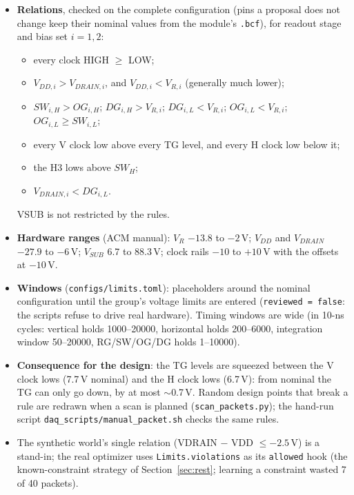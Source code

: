 \documentclass[10pt]{article}
\newcommand{\code}[1]{\texttt{#1}}
\begin{document}
\begin{itemize}
\item \textbf{Relations}, checked on the complete configuration (pins a proposal does not change keep their nominal values from the module's
  \code{.bcf}), for readout stage and bias set $i = 1, 2$:
  \begin{itemize}
  \item every clock HIGH $\ge$ LOW;
  \item $V_{DD,i} > V_{DRAIN,i}$, and $V_{DD,i} < V_{R,i}$ (generally much lower);
  \item $SW_{i,H} > OG_{i,H}$; $DG_{i,H} > V_{R,i}$; $DG_{i,L} < V_{R,i}$; $OG_{i,L} < V_{R,i}$; $OG_{i,L} \ge SW_{i,L}$;
  \item every V clock low above every TG level, and every H clock low below it;
  \item the H3 lows above $SW_H$;
  \item $V_{DRAIN,i} < DG_{i,L}$.
  \end{itemize}
  VSUB is not restricted by the rules.
\item \textbf{Hardware ranges} (ACM manual): $V_R$ $-13.8$ to $-2$\,V; $V_{DD}$ and $V_{DRAIN}$ $-27.9$ to $-6$\,V; $V_{SUB}$ 6.7 to 88.3\,V;
  clock rails $-10$ to $+10$\,V with the offsets at $-10$\,V.
\item \textbf{Windows} (\code{configs/limits.toml}): placeholders around the nominal configuration until the group's voltage limits are
  entered (\code{reviewed = false}: the scripts refuse to drive real hardware). Timing windows are wide (in 10-ns cycles: vertical holds
  1000--20000, horizontal holds 200--6000, integration window 50--20000, RG/SW/OG/DG holds 1--10000).
\item \textbf{Consequence for the design}: the TG levels are squeezed between the V clock lows (7.7\,V nominal) and the H clock lows
  (6.7\,V): from nominal the TG can only go down, by at most $\sim$0.7\,V. Random design points that break a rule are redrawn when a scan
  is planned (\code{scan\_packets.py}); the hand-run script \code{daq\_scripts/manual\_packet.sh} checks the same rules.
\item The synthetic world's single relation (VDRAIN $-$ VDD $\le -2.5$\,V) is a stand-in; the real optimizer uses \code{Limits.violations}
  as its \code{allowed} hook (the known-constraint strategy of Section~\ref{sec:rest}; learning a constraint wasted 7 of 40 packets).
\end{itemize}

\end{document}
